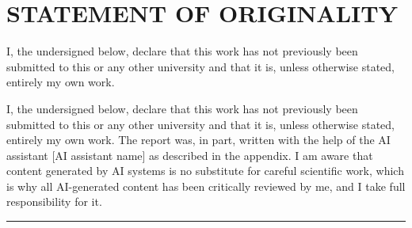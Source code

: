 \documentclass[../report.tex]{subfiles}
\begin{document}
    \section*{STATEMENT OF ORIGINALITY}

     I, the undersigned below, declare that this work has not previously been submitted to this or any other university and that it is, unless otherwise stated, entirely my own work.
    \newline

     I, the undersigned below, declare that this work has not previously been submitted to this or any other university and that it is, unless otherwise stated, entirely my own work. The report was, in part, written with the help of the AI assistant [AI assistant name] as described in the appendix. I am aware that content generated by AI systems is no substitute for careful scientific work, which is why all AI-generated content has been critically reviewed by me, and I take full responsibility for it.

    \vspace{1cm}

    \hrule width 0.45\linewidth
    \hfill \hspace{0.025\linewidth}
    \hrulefill

\end{document}
